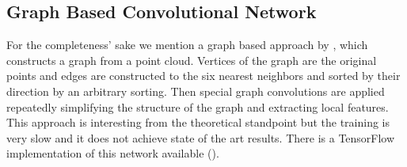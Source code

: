 \subsection{Graph Based Convolutional Network}
For the completeness’ sake we mention a graph based approach by \cite{dominguez_general-purpose_2018}, which constructs a graph from a point cloud. Vertices of the graph are the original points and edges are constructed to the six nearest neighbors and sorted by their direction by an arbitrary sorting. Then special graph convolutions are applied repeatedly simplifying the structure of the graph and extracting local features. This approach is interesting from the theoretical standpoint but the training is very slow and it does not achieve state of the art results. There is a TensorFlow implementation of this network available (\cite{dominguez_g3dnet_2018}).



